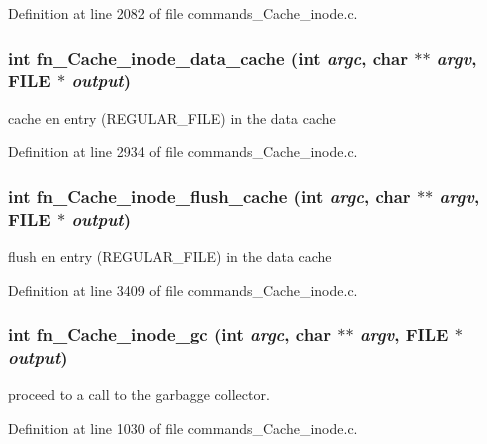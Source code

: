 Definition at line 2082 of file commands\_\-Cache\_\-inode.c.
\subsubsection[{fn\_\-Cache\_\-inode\_\-data\_\-cache}]{\setlength{\rightskip}{0pt plus 5cm}int fn\_\-Cache\_\-inode\_\-data\_\-cache (int {\em argc}, \/  char $\ast$$\ast$ {\em argv}, \/  FILE $\ast$ {\em output})}\label{commands__Cache__inode_8c_a0bdb2b1764b0dfb7ea511b24bb27549c}
cache en entry (REGULAR\_\-FILE) in the data cache 

Definition at line 2934 of file commands\_\-Cache\_\-inode.c.
\subsubsection[{fn\_\-Cache\_\-inode\_\-flush\_\-cache}]{\setlength{\rightskip}{0pt plus 5cm}int fn\_\-Cache\_\-inode\_\-flush\_\-cache (int {\em argc}, \/  char $\ast$$\ast$ {\em argv}, \/  FILE $\ast$ {\em output})}\label{commands__Cache__inode_8c_a096579b40ab0979f63b478dca8872192}
flush en entry (REGULAR\_\-FILE) in the data cache 

Definition at line 3409 of file commands\_\-Cache\_\-inode.c.
\subsubsection[{fn\_\-Cache\_\-inode\_\-gc}]{\setlength{\rightskip}{0pt plus 5cm}int fn\_\-Cache\_\-inode\_\-gc (int {\em argc}, \/  char $\ast$$\ast$ {\em argv}, \/  FILE $\ast$ {\em output})}\label{commands__Cache__inode_8c_af9e30aa72007966403bac9988d4eed5b}
proceed to a call to the garbagge collector. 

Definition at line 1030 of file commands\_\-Cache\_\-inode.c.
